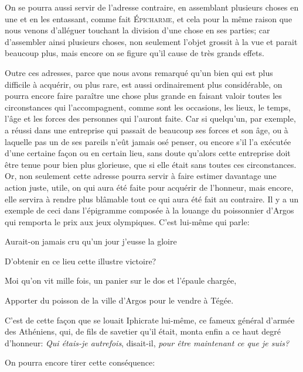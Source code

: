\bigbreak

On se pourra aussi servir de l'adresse contraire, en assemblant plusieurs choses en une et en les entassant, comme fait
\textsc{Épicharme}, et cela pour la même raison que nous venons d'alléguer touchant la division d'une chose en ses
parties; car d'assembler ainsi plusieurs choses, non seulement l'objet grossit à la vue et parait beaucoup plus, mais
encore on se figure qu'il cause de très grands effets. 

\bigbreak

Outre ces adresses, parce que nous avons remarqué qu'un bien qui est plus difficile à acquérir, ou plus rare, est aussi
ordinairement plus considérable, on pourra encore faire paraître une chose plus grande en faisant valoir toutes les circonstances
qui l’accompagnent, comme sont les occasions, les lieux, le temps, l'âge et les forces des personnes qui l'auront faite. Car
si quelqu'un, par exemple, a réussi dans une entreprise qui passait de beaucoup ses forces et son âge, ou à laquelle pas un
de ses pareils n'eût jamais osé penser, ou encore s'il l'a exécutée d'une certaine façon ou en certain lieu, sans doute
qu'alors cette entreprise doit être tenue pour bien plus glorieuse, que si elle était sans toutes ces circonstances. Or, non
seulement cette adresse pourra servir à faire estimer davantage une action juste, utile, on qui aura été faite pour acquérir
de l'honneur, mais encore, elle servira à rendre plus blâmable tout ce qui aura été fait au contraire. Il y a un exemple de
ceci dans l'épigramme composée à la louange du poissonnier d'Argos qui remporta le prix aux jeux olympiques. C'est lui-même
qui parle:

\begin{emphpar}
  Aurait-on jamais cru qu'un jour j'eusse la gloire

  D'obtenir en ce lieu cette illustre victoire?

  Moi qu'on vit mille fois, un panier sur le dos et l'épaule chargée,

  Apporter du poisson de la ville d'Argos pour le vendre à Tégée.
\end{emphpar}

C'est de cette façon que se louait Iphicrate lui-même, ce fameux général d'armée des Athéniens, qui, de fils de savetier
qu'il était, monta enfin a ce haut degré d'honneur: \emph{Qui étais-je autrefois}, disait-il, \emph{pour être maintenant
ce que je suis?}

\bigbreak

On pourra encore tirer cette conséquence:


